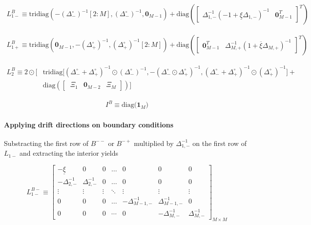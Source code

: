 \documentclass[11pt]{article}
\newcommand{\tridiag}{\ensuremath{\mathrm{tridiag}}}
\newcommand{\diag}{\ensuremath{\mathrm{diag}}}
\theoremstyle{definition}
\begin{document}
\begin{align}
{L}_{1-}^B \equiv
\tridiag \left(-(\Delta_-^\circ)^{-1}[2:M], (\Delta_-^\circ )^{-1}, \mathbf{0}_{M-1}  \right) +
\diag\left( 
\begin{bmatrix}
\Delta^{-1}_{1,-} (-1 + \underline{\xi} \Delta_{1,-})^{-1} &
\mathbf{0}_{M-1}^T
\end{bmatrix}^T
 \right)
\end{align}

\begin{align}
{L}_{1+}^B \equiv
\tridiag \left(\mathbf{0}_{M-1}, -(\Delta_+^\circ )^{-1}, (\Delta_+^\circ)^{-1}[2:M]  \right) +
\diag\left( 
\begin{bmatrix}
\mathbf{0}_{M-1}^T &
\Delta^{-1}_{M,+} (1 + \overline{\xi} \Delta_{M,+})^{-1}
\end{bmatrix}^T
\right)
\end{align}

\begin{align}
{L}_{2}^B \equiv
2 \odot \Big[ & \text{tridiag} \Big[(\Delta_-^\circ + \Delta_+^\circ)^{-1} \odot (\Delta_{-}^\circ)^{-1}, 
-(\Delta_-^\circ \odot \Delta_+^\circ)^{-1},
(\Delta_-^\circ + \Delta_+^\circ)^{-1} \odot (\Delta_{+}^\circ)^{-1} \Big] + \\ & \diag\left(  
\begin{bmatrix} \
\Xi_1 & \mathbf{0}_{M-2} & \Xi_M
\end{bmatrix}
  \right) \Big]
\end{align}

\begin{align}
I^B \equiv  \text{diag($\mathbf{1}_M$)}
\end{align}


\paragraph{Applying drift directions on boundary conditions}
Substracting the first row of $B^{--}$ or $B^{-+}$ multiplied by $\Delta_{1,-}^{-1}$ on the first row of $L_{1-}$ and extracting the interior yields

\begin{equation}
L_{1-}^{B-} \equiv \begin{bmatrix}
-\underline{\xi} &0&0&\dots&0&0&0\\
-\Delta_{2,-}^{-1}&\Delta_{2,-}^{-1}&0&\dots&0&0&0\\
\vdots&\vdots&\vdots&\ddots&\vdots&\vdots&\vdots\\
0&0&0&\dots&-\Delta_{M-1,-}^{-1}&\Delta_{M-1,-}^{-1}&0\\
0&0&0&\cdots&0&-\Delta_{M,-}^{-1}&\Delta_{M,-}^{-1}
\end{bmatrix}_{M\times M}
\end{equation}
\end{document}
